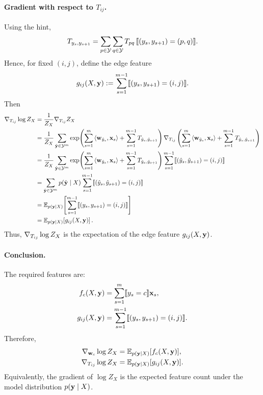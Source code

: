\documentclass[11pt]{report}
\begin{document}
\paragraph{Gradient with respect to $T_{ij}$.}
Using the hint,
\begin{align}
T_{y_s,y_{s+1}}
=
\sum_{p\in\mathcal{Y}}\sum_{q\in\mathcal{Y}}
T_{pq}\,\llbracket (y_s,y_{s+1})=(p,q)\rrbracket.
\end{align}
Hence, for fixed $(i,j)$, define the edge feature
\begin{align}
g_{ij}(X,\mathbf{\boldsymbol{y}})
:=
\sum_{s=1}^{m-1}
\llbracket (y_s,y_{s+1})=(i,j)\rrbracket.
\end{align}
Then
\begin{align}
{\nabla}_{T_{ij}}\log Z_X
&=
\frac{1}{Z_X}{\nabla}_{T_{ij}} Z_X \\
&=
\frac{1}{Z_X}
\sum_{\hat{\mathbf{\boldsymbol{y}}}\in\mathcal{Y}^m}
\exp\!\left(
\sum_{s=1}^m \left\langle \mathbf{\boldsymbol{w}}_{\hat y_s},\mathbf{\boldsymbol{x}}_s \right\rangle
+
\sum_{s=1}^{m-1} T_{\hat y_s,\hat y_{s+1}}
\right)
{\nabla}_{T_{ij}}
\left(
\sum_{s=1}^m \left\langle \mathbf{\boldsymbol{w}}_{\hat y_s},\mathbf{\boldsymbol{x}}_s \right\rangle
+
\sum_{s=1}^{m-1} T_{\hat y_s,\hat y_{s+1}}
\right) \\
&=
\frac{1}{Z_X}
\sum_{\hat{\mathbf{\boldsymbol{y}}}\in\mathcal{Y}^m}
\exp\!\left(
\sum_{s=1}^m \left\langle \mathbf{\boldsymbol{w}}_{\hat y_s},\mathbf{\boldsymbol{x}}_s \right\rangle
+
\sum_{s=1}^{m-1} T_{\hat y_s,\hat y_{s+1}}
\right)
\sum_{s=1}^{m-1}
\llbracket (\hat y_s,\hat y_{s+1})=(i,j)\rrbracket \\
&=
\sum_{\hat{\mathbf{\boldsymbol{y}}}\in\mathcal{Y}^m}
p(\hat{\mathbf{\boldsymbol{y}}}\mid X)
\sum_{s=1}^{m-1}
\llbracket (\hat y_s,\hat y_{s+1})=(i,j)\rrbracket \\
&=
\mathbb{E}_{p(\mathbf{\boldsymbol{y}}\mid X)}\!\left[
\sum_{s=1}^{m-1}
\llbracket (y_s,y_{s+1})=(i,j)\rrbracket
\right] \\
&=
\mathbb{E}_{p(\mathbf{\boldsymbol{y}}\mid X)}\!\left[g_{ij}(X,\mathbf{\boldsymbol{y}})\right].
\end{align}
Thus, ${\nabla}_{T_{ij}}\log Z_X$ is the expectation of the edge feature $g_{ij}(X,\mathbf{\boldsymbol{y}})$.

\paragraph{Conclusion.}
The required features are:
\begin{align}
f_c(X,\mathbf{\boldsymbol{y}})
&=
\sum_{s=1}^m \llbracket y_s = c \rrbracket \mathbf{\boldsymbol{x}}_s,
\\
g_{ij}(X,\mathbf{\boldsymbol{y}})
&=
\sum_{s=1}^{m-1}
\llbracket (y_s,y_{s+1})=(i,j)\rrbracket.
\end{align}
Therefore,
\begin{align}
{\nabla}_{\mathbf{\boldsymbol{w}}_c}\log Z_X
&=
\mathbb{E}_{p(\mathbf{\boldsymbol{y}}\mid X)}[f_c(X,\mathbf{\boldsymbol{y}})],
\\
{\nabla}_{T_{ij}}\log Z_X
&=
\mathbb{E}_{p(\mathbf{\boldsymbol{y}}\mid X)}[g_{ij}(X,\mathbf{\boldsymbol{y}})].
\end{align}
Equivalently, the gradient of $\log Z_X$ is the expected feature count under the model distribution $p(\mathbf{\boldsymbol{y}}\mid X)$.
\end{document}
